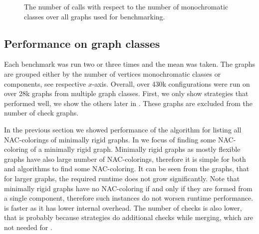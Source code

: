 \begin{figure}[ht]
	\centering
	\scalebox{0.5}{}
	\caption[The number of \IsNACColoring{} calls.]{
		The number of \IsNACColoring{} calls with respect to the number of monochromatic classes
		over all graphs used for benchmarking.}%
	\label{fig:graph_summary}
\end{figure}






\subsection{Performance on graph classes}%


Each benchmark was run two or three times and the mean was taken.
The graphs are grouped either by the number of vertices
monochromatic classes or \trcon{} components, see respective \(x\)-axis.
Overall, over 430k configurations were run
on over 28k graphs from multiple graph classes.
First, we only show strategies that performed well,
we show the others later in .
These graphs are excluded from the number of check graphs.

In the previous section we showed performance of the algorithm for listing
all NAC-colorings of minimally rigid graphs.
In 
we focus of finding some NAC-coloring of a minimally rigid graph.
Minimally rigid graphs as mostly flexible graphs have also
large number of NAC-colorings, therefore it is simple for both \NaiveCycles{}
and \Subgraphs{} algorithms to find some NAC-coloring.
It can be seen from the graphs, that for larger graphs, the required runtime
does not grow significantly.
Note that minimally rigid graphs have no NAC-coloring if and only if they are formed from
a single \trcon{} component, therefore such instances do not worsen runtime performance.
\NaiveCycles{} is faster as it has lower internal overhead.
The number of \IsNACColoring{} checks is also lower,
that is probably because \Subgraphs{} strategies do additional checks
while merging, which are not needed for \NaiveCycles{}.

